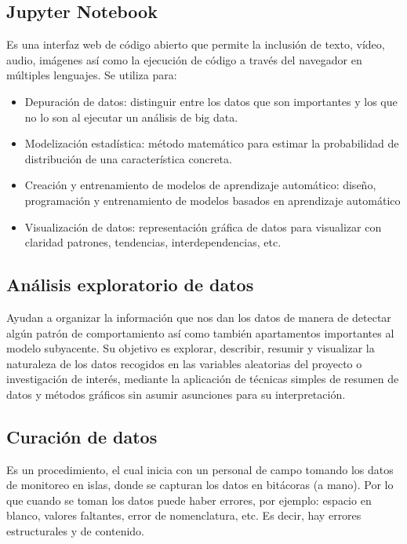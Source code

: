 \documentclass[12pt,letterpaper]{article}
\begin{document}
\subsection*{Jupyter Notebook}
Es una interfaz web de código abierto que permite la inclusión de texto, vídeo, audio, imágenes así
como la ejecución de código a través del navegador en múltiples lenguajes. 
\citep{cabrera_diaz_jupyter}
Se utiliza para: 
\begin{itemize}
\item Depuración de datos: distinguir entre los datos que son importantes y los que no lo son al
ejecutar un análisis de big data.
\item Modelización estadística: método matemático para estimar la probabilidad de distribución de
una característica concreta.
\item Creación y entrenamiento de modelos de aprendizaje automático: diseño, programación y
entrenamiento de modelos basados en aprendizaje automático
\item Visualización de datos: representación gráfica de datos para visualizar con claridad patrones,
tendencias, interdependencias, etc.
\citep{digital_guide_ionos_jupyter}
\end{itemize}

\subsection*{Análisis exploratorio de datos}
Ayudan a organizar la información que nos dan los datos de manera de detectar algún patrón de
comportamiento así como también apartamentos importantes al modelo subyacente.
\citep{orella_analisis_exploratorio}
Su objetivo es explorar, describir, resumir y visualizar la naturaleza de los datos recogidos en las
variables aleatorias del proyecto o investigación de interés, mediante la aplicación de técnicas
simples de resumen de datos y métodos gráficos sin asumir asunciones para su interpretación.
\citep{heix_bios_analisis_exploratorio}

\subsection*{Curación de datos}
Es un procedimiento, el cual inicia con un personal de campo tomando los datos de monitoreo en
islas, donde se capturan los datos en bitácoras (a mano).  Por lo que cuando se toman los datos
puede haber errores, por ejemplo: espacio en blanco, valores faltantes, error de nomenclatura, etc.
Es decir, hay errores estructurales y de contenido. 
\end{document}
